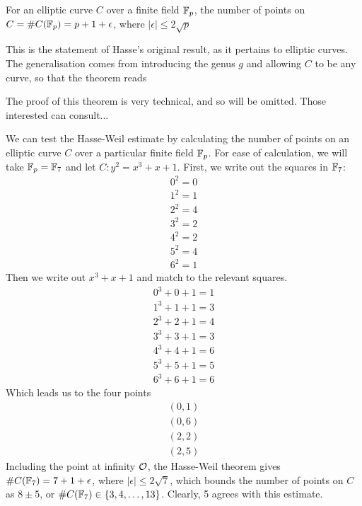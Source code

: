 
\begin{theorem}
For an elliptic curve $C$ over a finite field $\fp$, the number of points on $C = \#C(\fp) = p + 1 + \epsilon$, where $|\epsilon| \leq 2\sqrt{p}$
\end{theorem}
	This is the statement of Hasse's original result, as it pertains to elliptic curves.
	The generalisation comes from introducing the genus $g$ and allowing $C$ to be any curve, so that the theorem reads
\begin{sproof}
	The proof of this theorem is very technical, and so will be omitted.
	Those interested can consult...
\end{sproof}
We can test the Hasse-Weil estimate by calculating the number of points on an elliptic curve $C$ over a particular finite field $\fp$. For ease of calculation, we will take $\fp = \fp[7]$ and let $C : y^2 = x^3 + x + 1$. First, we write out the squares in $\fp[7]$:
\begin{align*}
0^2 = 0\\
1^2 = 1\\
2^2 = 4\\
3^2 = 2\\
4^2 = 2\\
5^2 = 4\\
6^2 = 1
\end{align*}
Then we write out $x^3+x+1$ and match to the relevant squares.
\begin{align*}
0^3 + 0 + 1 = 1\\
1^3 + 1 + 1 = 3\\
2^3 + 2 + 1 = 4\\
3^3 + 3 + 1 = 3\\
4^3 + 4 + 1 = 6\\
5^3 + 5 + 1 = 5\\
6^3 + 6 + 1 = 6
\end{align*}
Which leads us to the four points
\begin{align*}
(0,1)\\
(0,6)\\
(2,2)\\
(2,5)
\end{align*}
Including the point at infinity $\pai$, the Hasse-Weil theorem gives $\#C(\fp[7]) = 7 + 1 + \epsilon$, where $|\epsilon| \leq 2\sqrt{7}$, which bounds the number of points on $C$ as $8\pm5$, or $\#C(\fp[7]) \in \{3,4,\ldots,13\}$. Clearly, 5 %
agrees with this estimate.
